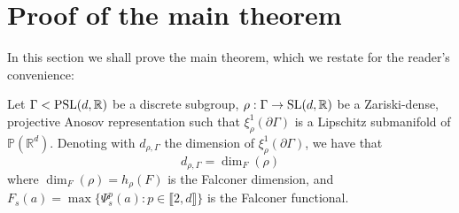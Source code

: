 \documentclass{report}
\begin{document}
\section{Proof of the main theorem}
In this section we shall prove the main theorem, which we restate for the reader's convenience:
\begin{theorem}
    Let $\Gamma < \operatorname{{\mathrm{PSL}}}(d, \mathbb R)$ be a discrete subgroup, $\rho: \Gamma \to \operatorname{{\mathrm{SL}}}(d, \mathbb R)$ be a Zariski-dense, projective Anosov representation such that $\xi^1_\rho(\partial \Gamma)$ is a Lipschitz submanifold of $\mathbb P(\mathbb R^d)$.
    Denoting with $d_{\rho, \Gamma}$ the dimension of $\xi^1_\rho(\partial \Gamma)$, we have that
    \[
        d_{\rho, \Gamma} = \dim_F(\rho)
    \]
    where $\dim_F(\rho) = h_\rho(F)$ is the Falconer dimension, and $F_s(a) = \max \{ \Psi_s^p(a) : p \in \llbracket 2, d \rrbracket\}$ is the Falconer functional.
\end{theorem}
\end{document}
